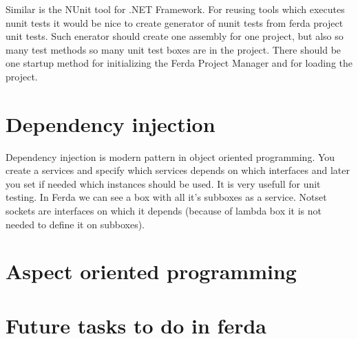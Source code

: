 \documentclass{article}
\begin{document}
Similar is the NUnit tool for .NET Framework. For reusing tools which executes nunit tests it would be nice to create generator of nunit tests from ferda project unit tests. Such enerator should create one assembly for one project, but also so many test methods so many unit test boxes are in the project. There should be one startup method for initializing the Ferda Project Manager and for loading the project. 

\section{Dependency injection}
Dependency injection is modern pattern in object oriented programming. You create a services and specify which services depends on which interfaces and later you set if needed which instances should be used. It is very usefull for unit testing. In Ferda we can see a box with all it's subboxes as a service. Notset sockets are interfaces on which it depends (because of lambda box it is not needed to define it on subboxes).

\section{Aspect oriented programming}
\section{Future tasks to do in ferda}


\end{document}
